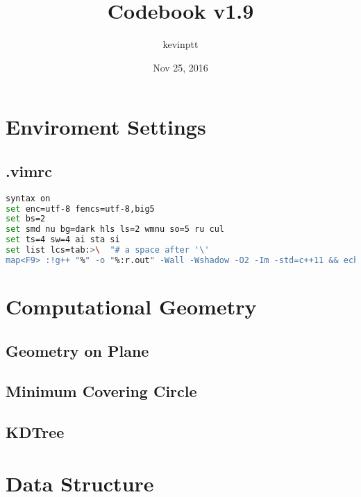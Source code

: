 \documentclass[11pt,twocolumn,a4paper]{article}
\title{Codebook v1.9}
\author{kevinptt}
\date{Nov 25, 2016}
\begin{document}
\setlength{\headheight}{30pt}
\pagestyle{fancy}
\fancyhead[R]{\thepage}
\fancyfoot{}
\renewcommand{\contentsname}{Index}
\tableofcontents


\newpage
\section{Enviroment Settings}
\subsection{.vimrc}
\begin{lstlisting}[label=.vimrc,language=bash]
syntax on
set enc=utf-8 fencs=utf-8,big5
set bs=2
set smd nu bg=dark hls ls=2 wmnu so=5 ru cul
set ts=4 sw=4 ai sta si
set list lcs=tab:>\  "# a space after '\'
map<F9> :!g++ "%" -o "%:r.out" -Wall -Wshadow -O2 -Im -std=c++11 && echo "===== done =====" && "./%:r.out"
\end{lstlisting}


\newpage
\section{Computational Geometry}

\subsection{Geometry on Plane}


\subsection{Minimum Covering Circle}


\subsection{KDTree}



\newpage
\section{Data Structure}
\end{document}
